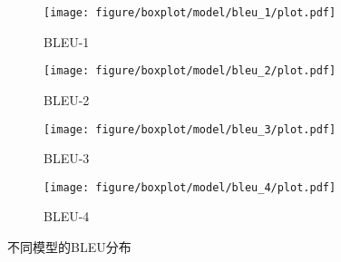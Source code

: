 \begin{figure}[H]
    \begin{subfigure}{0.5\linewidth}
        \centering
        \texttt{[image: figure/boxplot/model/bleu\_1/plot.pdf]}
        \caption{BLEU-1}
    \end{subfigure}%
    \begin{subfigure}{0.5\linewidth}
        \centering
        \texttt{[image: figure/boxplot/model/bleu\_2/plot.pdf]}
        \caption{BLEU-2}
    \end{subfigure}
    \begin{subfigure}{0.5\linewidth}
        \centering
        \texttt{[image: figure/boxplot/model/bleu\_3/plot.pdf]}
        \caption{BLEU-3}
    \end{subfigure}%
    \begin{subfigure}{0.5\linewidth}
        \centering
        \texttt{[image: figure/boxplot/model/bleu\_4/plot.pdf]}
        \caption{BLEU-4}
    \end{subfigure}
    \centering
    \caption{不同模型的BLEU分布}
    \label{fig:BLEU_model}
\end{figure}

